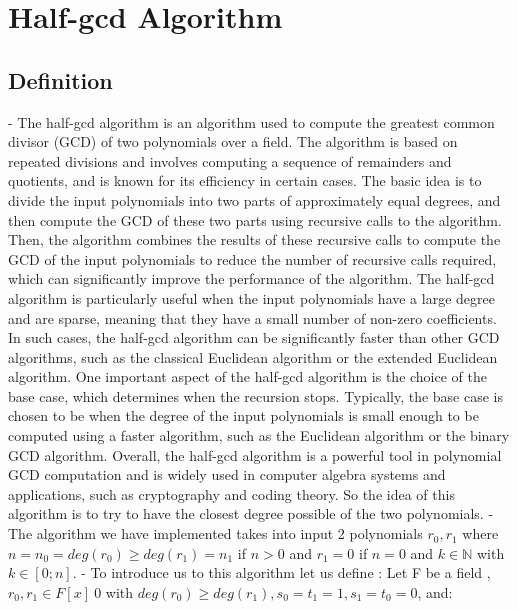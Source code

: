 \newpage
\section{Half-gcd Algorithm}
\subsection{Definition }
\newline - The half-gcd algorithm is an algorithm used to compute the greatest common divisor (GCD) of two polynomials over a field. The algorithm is based on repeated divisions and involves computing a sequence of remainders and quotients, and is known for its efficiency in certain cases. The basic idea is to divide the input polynomials into two parts of approximately equal degrees, and then compute the GCD of these two parts using recursive calls to the algorithm. Then, the algorithm combines the results of these recursive calls to compute the GCD of the input polynomials to reduce the number of recursive calls required, which can significantly improve the performance of the algorithm.
The half-gcd algorithm is particularly useful when the input polynomials have a large degree and are sparse, meaning that they have a small number of non-zero coefficients. In such cases, the half-gcd algorithm can be significantly faster than other GCD algorithms, such as the classical Euclidean algorithm or the extended Euclidean algorithm.
One important aspect of the half-gcd algorithm is the choice of the base case, which determines when the recursion stops. Typically, the base case is chosen to be when the degree of the input polynomials is small enough to be computed using a faster algorithm, such as the Euclidean algorithm or the binary GCD algorithm.
Overall, the half-gcd algorithm is a powerful tool in polynomial GCD computation and is widely used in computer algebra systems and applications, such as cryptography and coding theory.
\newline 
So the idea of this algorithm is to try to have the closest degree possible of the two polynomials.
\newline
\newline - The algorithm we have implemented takes into input 2 polynomials $r_0, r_1$ where $n = n_0 = deg(r_0) \geq deg(r_1) = n_1$ if $ n > 0$ and $r_1 = 0$ if $n = 0$ and $k \in \mathbb{N}$ with $k \in [0;n]$.
\newline
\newline- To introduce us to this algorithm let us define :
Let F be a field ,  $ r_0,r_1\in F[x]\ {0}$ with $deg(r_0) \geq deg(r_1) , s_0 = t_1 = 1 , s_1 = t_0 =0 $, and: 
